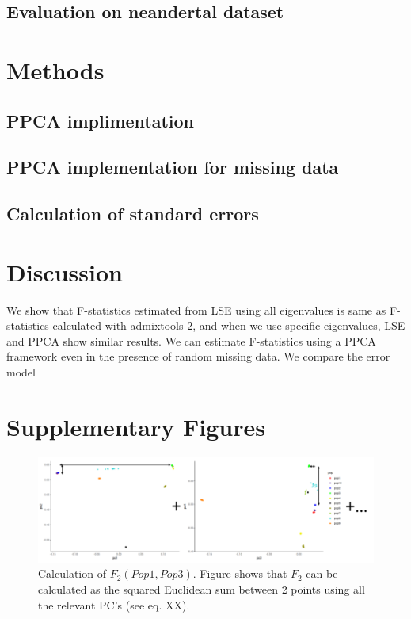 \documentclass[12pt, letterpaper]{article}
\begin{document}
\subsection{Evaluation on neandertal dataset}


\section{Methods}

\subsection{PPCA implimentation}

\subsection{PPCA implementation for missing data}

\subsection{Calculation of standard errors}

\section{Discussion}

We show that F-statistics estimated from LSE using all eigenvalues is same as F-statistics calculated with admixtools 2, and when we use specific eigenvalues, LSE and PPCA show similar results. We can estimate F-statistics using a PPCA framework even in the presence of random missing data. We compare the error model 




\section{Supplementary Figures}

\begin{figure}[ht!]
    \includegraphics[width=16.5cm]{inkscape/pca.png}
    \centering
    \caption{Calculation of $F_2(Pop1,Pop3)$. Figure shows that $F_2$ can be calculated as the squared Euclidean sum between 2 points using all the relevant PC's (see eq. XX).}
    \label{figS1:pc_scale}
\end{figure}
\end{document}
